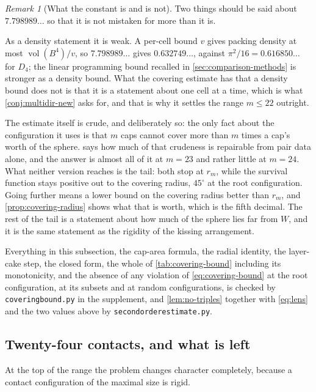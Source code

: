 \documentclass[11pt,reqno]{amsart}
\renewcommand{\_}{\origunderscore\allowbreak}
\numberwithin{equation}{section}
\theoremstyle{plain}
\theoremstyle{definition}
\theoremstyle{remark}
\newtheorem{remark}[thm]{Remark}
\DeclareMathOperator{\vol}{vol}
\begin{document}
\begin{remark}[What the constant is and is not]\label{rem:covering-scope}
Two things should be said about $7.798989\ldots$ so that it is not
mistaken for more than it is.

As a density statement it is weak. A per-cell bound $v$ gives packing
density at most $\vol(B^4)/v$, so $7.798989\ldots$ gives $0.632749\ldots$,
against $\pi^2/16=0.616850\ldots$ for $D_4$; the linear programming
bound recalled in \cref{sec:comparison-methods} is stronger as a density
bound.
What the covering estimate has that a density bound does not is that it
is a statement about one cell at a time, which is what
\cref{conj:multidir-new} asks for, and that is why it settles the range
$m\le22$ outright.

The estimate itself is crude, and deliberately so: the only fact about
the configuration it uses is that $m$ caps cannot cover more than $m$
times a cap's worth of the sphere.  says how
much of that crudeness is repairable from pair data alone, and the
answer is almost all of it at $m=23$ and rather little at $m=24$. What
neither version reaches is the tail: both stop at $r_m$, while the
survival function stays positive out to the covering radius, $45^\circ$
at the root configuration. Going further means a lower bound on the
covering radius better than $r_m$, and \cref{prop:covering-radius} shows
what that is worth, which is the fifth decimal. The rest of the tail is
a statement about how much of the sphere lies far from $W$, and it is
the same statement as the rigidity of the kissing arrangement.

Everything in this subsection, the cap-area formula, the radial
identity, the layer-cake step, the closed form, the whole of
\cref{tab:covering-bound} including its monotonicity, and the absence of
any violation of \eqref{eq:covering-bound} at the root configuration, at
its subsets and at random configurations, is checked by
\texttt{covering\_bound.py} in the supplement, and \cref{lem:no-triples}
together with \eqref{eq:lens} and the two values above by
\texttt{second\_order\_estimate.py}.
\end{remark}

\subsection{Twenty-four contacts, and what is left}\label{sec:m24}

At the top of the range the problem changes character completely, because
a contact configuration of the maximal size is rigid.
\end{document}

